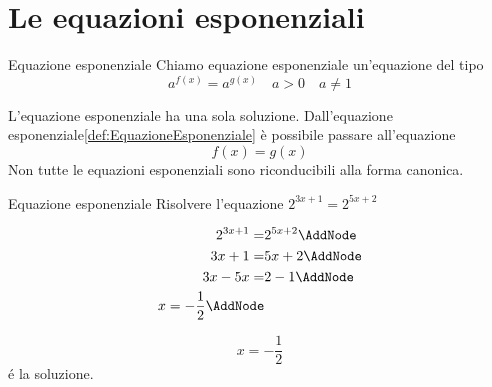\chapter{Le equazioni esponenziali}
\label{cha:LeEquazioniEsponenziali}
\begin{definizionet}{Equazione esponenziale}{}\label{def:EquazioneEsponenziale}
Chiamo equazione esponenziale un'equazione del tipo \[a^{f(x)}=a^{g(x)}\quad a>0\quad  a\neq1 \]
\end{definizionet}
L'equazione esponenziale ha una sola soluzione. 
Dall'equazione esponenziale\nobs\vref{def:EquazioneEsponenziale} è possibile passare all'equazione \[f(x)=g(x) \]Non tutte le equazioni esponenziali sono riconducibili alla forma canonica.
\begin{esempiot}{Equazione esponenziale}{}
	Risolvere l'equazione $2^{3x+1}=2^{5x+2} $
\end{esempiot}
\begin{NodesList}%
\begin{align*}
2^{3x+1}=&2^{5x+2}\AddNode\\
3x+1=&5x+2\AddNode\\
3x-5x=&2-1\AddNode\\
x=-\dfrac{1}{2}\AddNode
\end{align*}
%
%
%
\end{NodesList}
\[x=-\dfrac{1}{2}\]
\'{e} la soluzione.

